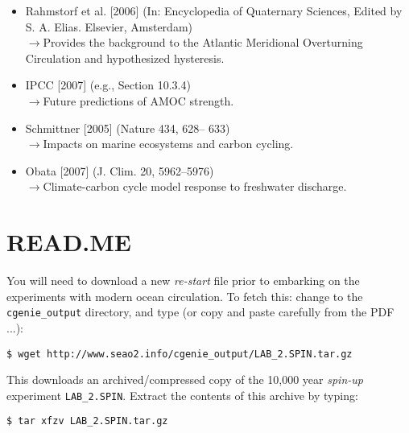 \documentclass[11pt,fleqn]{book} %
\begin{document}
\vspace{2mm}
\begin{itemize}
\item Rahmstorf et al. [2006] (In: Encyclopedia of Quaternary Sciences, Edited by S. A. Elias. Elsevier, Amsterdam)
\\\(\rightarrow\)Provides the background to the Atlantic Meridional Overturning Circulation and hypothesized hysteresis.
\item IPCC [2007] (e.g., Section 10.3.4)
\\\(\rightarrow\)Future predictions of AMOC strength.
\item Schmittner [2005] (Nature 434, 628– 633)
\\\(\rightarrow\)Impacts on marine ecosystems and carbon cycling.
\item Obata [2007] (J. Clim. 20, 5962–5976)
\\\(\rightarrow\)Climate-carbon cycle model response to freshwater discharge.
\end{itemize}


\newpage


\section*{READ.ME}

You will need to download a new \textit{re-start} file prior to embarking on the experiments with modern ocean circulation.
To fetch this: change to the \texttt{cgenie\_output} directory, and type (or copy and paste carefully from the PDF ...):

\vspace{-2mm}
\begin{verbatim}
$ wget http://www.seao2.info/cgenie_output/LAB_2.SPIN.tar.gz
\end{verbatim}
\vspace{-2mm}

This downloads an archived/compressed copy of the 10,000 year \textit{spin-up} experiment \texttt{LAB\_2.SPIN}. Extract the contents of this archive by typing:

\vspace{-2mm}
\begin{verbatim}
$ tar xfzv LAB_2.SPIN.tar.gz
\end{verbatim}
\vspace{-2mm}
\end{document}
